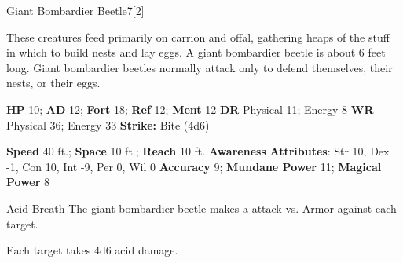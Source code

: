   \begin{monsection}{Giant Bombardier Beetle}{7}[2]
    \vspace{-1em}\vspace{-1em}
    \vspace{0em}

    
      These creatures feed primarily on carrion and offal, gathering heaps of the stuff in which to build nests and lay eggs.
      A giant bombardier beetle is about 6 feet long. Giant bombardier beetles normally attack only to defend themselves, their nests, or their eggs.
    

    \begin{spellcontent}
      \begin{spelltargetinginfo}
        \pari \textbf{HP} 10;
          \textbf{AD} 12;
          \textbf{Fort} 18;
          \textbf{Ref} 12;
          \textbf{Ment} 12
        \pari \textbf{DR} Physical 11; Energy 8
        \pari \textbf{WR} Physical 36; Energy 33
        \pari \textbf{Strike:}
            Bite  (4d6)
      \end{spelltargetinginfo}
    \end{spellcontent}
    \begin{monsterfooter}
      \pari \textbf{Speed} 40 ft.;
        \textbf{Space} 10 ft.;
        \textbf{Reach} 10 ft.
      \pari \textbf{Awareness} 
      \pari \textbf{Attributes}:
        Str 10, Dex -1,
        Con 10, Int -9,
        Per 0, Wil 0
      \pari \textbf{Accuracy} 9;
        \textbf{Mundane Power} 11;
      \textbf{Magical Power} 8
    \end{monsterfooter}
  \end{monsection}
  \begin{freeability}{Acid Breath}
      The giant bombardier beetle makes a  attack
        vs. Armor against each target.
    
    \hit Each target takes 4d6 acid damage.
    \end{freeability}
  
